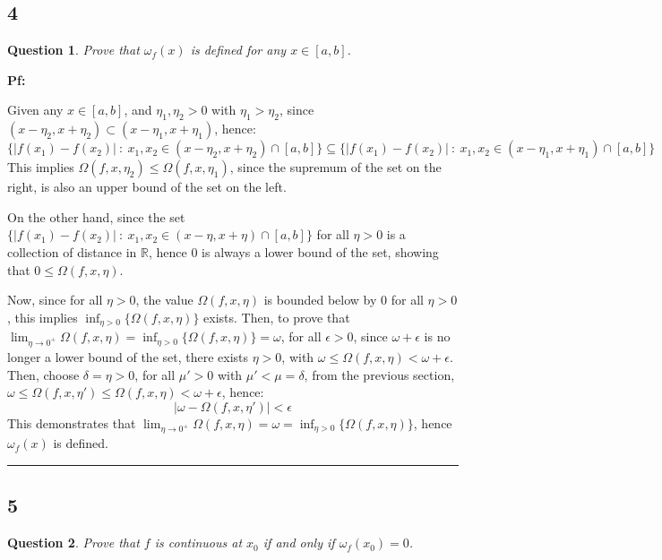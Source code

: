 \documentclass{article}
\newtheorem{question}{Question}
\begin{document}
\subsection*{4}
\begin{myBox2}[]{}
    \begin{question}
        Prove that $\omega_f(x)$ is defined for any $x\in[a,b]$.
    \end{question}
\end{myBox2}

\textbf{Pf:}

Given any $x\in[a,b]$, and $\eta_1,\eta_2>0$ with $\eta_1>\eta_2$, since $(x-\eta_2,x+\eta_2)\subset (x-\eta_1,x+\eta_1)$, hence:
$$\{|f(x_1)-f(x_2)|\ :\ x_1,x_2\in (x-\eta_2,x+\eta_2) \cap [a,b]\}\subseteq \{|f(x_1)-f(x_2)|\ :\ x_1,x_2\in (x-\eta_1,x+\eta_1) \cap [a,b]\}$$
This implies $\Omega(f,x,\eta_2)\leq \Omega(f,x,\eta_1)$, since the supremum of the set on the right, is also an upper bound of the set on the left.

On the other hand, since the set $\{|f(x_1)-f(x_2)|\ :\ x_1,x_2\in (x-\eta,x+\eta) \cap [a,b]\}$ for all $\eta>0$ is a collection of distance in $\mathbb{R}$,
hence $0$ is always a lower bound of the set, showing that $0\leq \Omega(f,x,\eta)$.

\hfill

Now, since for all $\eta>0$, the value $\Omega(f,x,\eta)$ is bounded below by $0$ for all $\eta>0$, this implies $\inf_{\eta>0}\{\Omega(f,x,\eta)\}$ exists.
Then, to prove that $\lim_{\eta\rightarrow 0^+}\Omega(f,x,\eta)=\inf_{\eta>0}\{\Omega(f,x,\eta)\}=\omega$, for all $\epsilon>0$, since $\omega+\epsilon$ is no longer a lower bound of the set,
there exists $\eta>0$, with $\omega \leq \Omega(f,x,\eta)<\omega+\epsilon$. Then, choose $\delta = \eta>0$, 
for all $\mu'>0$ with $\mu'<\mu = \delta$, from the previous section, $\omega \leq \Omega(f,x,\eta')\leq \Omega(f,x,\eta) < \omega+\epsilon$, hence:
$$|\omega-\Omega(f,x,\eta')| < \epsilon$$
This demonstrates that $\lim_{\eta\rightarrow 0^+}\Omega(f,x,\eta)=\omega=\inf_{\eta>0}\{\Omega(f,x,\eta)\}$, hence $\omega_f(x)$ is defined.

\hfill

\rule{15.5cm}{0.1mm}

\hfill

\subsection*{5}
\begin{myBox2}[]{}
    \begin{question}
        Prove that $f$ is continuous at $x_0$ if and only if $\omega_f(x_0)=0$.
    \end{question}
\end{myBox2}
\end{document}
